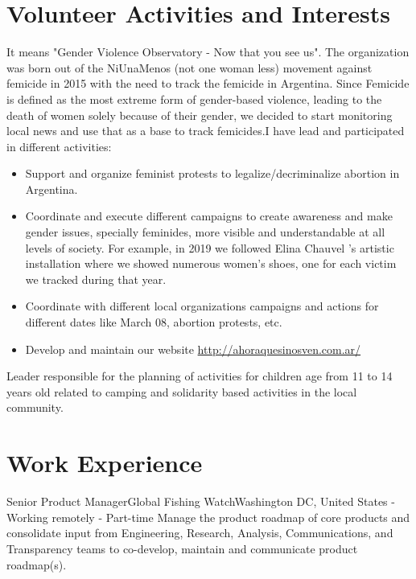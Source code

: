 \documentclass[11pt,a4paper,sans]{moderncv}
\begin{document}
\section{Volunteer Activities and Interests}
{
It means "Gender Violence Observatory - Now that you see us". The organization was born out of the NiUnaMenos (not one woman less) movement against femicide in 2015 with the need to track the femicide in Argentina. Since Femicide is defined as the most extreme form of gender-based violence, leading to the death of women solely because of their gender,
we decided to start monitoring local news and use that as a base to track femicides.I have lead and participated in different activities:
}
\begin{itemize}
  \item Support and organize feminist protests to legalize/decriminalize abortion in Argentina.
  \item Coordinate and execute different campaigns to create awareness and make gender issues, specially feminides, more visible and understandable at all levels of society. For example, in 2019 we followed Elina Chauvel 's artistic installation where we showed numerous women's shoes, one for each victim we tracked during that year.
  \item Coordinate with different local organizations campaigns and actions for different dates like March 08, abortion protests, etc.
  \item Develop and maintain our website {\url{http://ahoraquesinosven.com.ar/}}
\newline
\end{itemize}

{Leader responsible for the planning of activities for children age from 11 to 14 years old related to camping and solidarity based activities in the local community.}


\section{Work Experience}
 {Senior Product Manager}{Global Fishing Watch}{Washington DC, United States - Working remotely - Part-time }{}{}{}
  Manage the product roadmap of core products and consolidate input from Engineering, Research, Analysis, Communications, and Transparency teams to co-develop, maintain and communicate product roadmap(s).
\\
\end{document}

